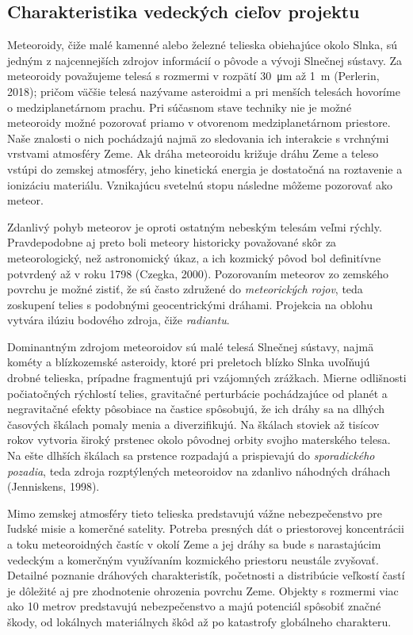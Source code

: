 \hypertarget{charakteristika-vedeckuxfdch-cieux13eov-projektu}{%
\subsection{Charakteristika vedeckých cieľov
projektu}\label{charakteristika-vedeckuxfdch-cieux13eov-projektu}}

Meteoroidy, čiže malé kamenné alebo železné telieska obiehajúce okolo
Slnka, sú jedným z najcennejších zdrojov informácií o pôvode a vývoji
Slnečnej sústavy. Za meteoroidy považujeme telesá s rozmermi v rozpätí
\SI{30}{\micro\metre} až \SI{1}{\metre} (Perlerin, 2018); pričom väčšie
telesá nazývame asteroidmi a pri menších telesách hovoríme o
medziplanetárnom prachu. Pri súčasnom stave techniky nie je možné
meteoroidy možné pozorovať priamo v otvorenom medziplanetárnom
priestore. Naše znalosti o nich pochádzajú najmä zo sledovania ich
interakcie s vrchnými vrstvami atmosféry Zeme. Ak dráha meteoroidu
križuje dráhu Zeme a teleso vstúpi do zemskej atmosféry, jeho kinetická
energia je dostatočná na roztavenie a ionizáciu materiálu. Vznikajúcu
svetelnú stopu následne môžeme pozorovať ako meteor.

Zdanlivý pohyb meteorov je oproti ostatným nebeským telesám veľmi
rýchly. Pravdepodobne aj preto boli meteory historicky považované skôr
za meteorologický, než astronomický úkaz, a ich kozmický pôvod bol
definitívne potvrdený až v roku 1798 (Czegka, 2000). Pozorovaním
meteorov zo zemského povrchu je možné zistiť, že sú často združené do
\emph{meteorických rojov}, teda zoskupení telies s podobnými
geocentrickými dráhami. Projekcia na oblohu vytvára ilúziu bodového
zdroja, čiže \emph{radiantu}.

Dominantným zdrojom meteoroidov sú malé telesá Slnečnej sústavy, najmä
kométy a blízkozemské asteroidy, ktoré pri preletoch blízko Slnka
uvoľňujú drobné telieska, prípadne fragmentujú pri vzájomných zrážkach.
Mierne odlišnosti počiatočných rýchlostí telies, gravitačné perturbácie
pochádzajúce od planét a negravitačné efekty pôsobiace na častice
spôsobujú, že ich dráhy sa na dlhých časových škálach pomaly menia a
diverzifikujú. Na škálach stoviek až tisícov rokov vytvoria široký
prstenec okolo pôvodnej orbity svojho materského telesa. Na ešte dlhších
škálach sa prstence rozpadajú a prispievajú do \emph{sporadického
pozadia}, teda zdroja rozptýlených meteoroidov na zdanlivo náhodných
dráhach (Jenniskens, 1998).

Mimo zemskej atmosféry tieto telieska predstavujú vážne nebezpečenstvo
pre ľudské misie a komerčné satelity. Potreba presných dát o
priestorovej koncentrácii a toku meteoroidných častíc v okolí Zeme a jej
dráhy sa bude s narastajúcim vedeckým a komerčným využívaním kozmického
priestoru neustále zvyšovať. Detailné poznanie dráhových charakteristík,
početnosti a distribúcie veľkostí častí je dôležité aj pre zhodnotenie
ohrozenia povrchu Zeme. Objekty s rozmermi viac ako 10 metrov
predstavujú nebezpečenstvo a majú potenciál spôsobiť značné škody, od
lokálnych materiálnych škôd až po katastrofy globálneho charakteru.

